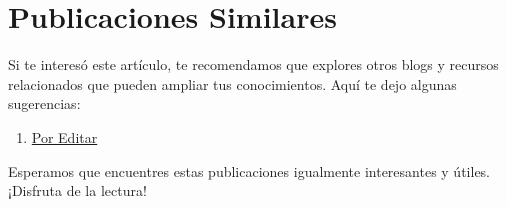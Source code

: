 \documentclass[
  doc,
  floatsintext,
  longtable,
  a4paper,
  nolmodern,
  notxfonts,
  notimes,
  colorlinks=true,linkcolor=blue,citecolor=blue,urlcolor=blue]{apa7}
\providecommand{\tightlist}{%
  \setlength{\itemsep}{0pt}\setlength{\parskip}{0pt}}
\begin{document}
\section{Publicaciones Similares}\label{publicaciones-similares}

Si te interesó este artículo, te recomendamos que explores otros blogs y
recursos relacionados que pueden ampliar tus conocimientos. Aquí te dejo
algunas sugerencias:

\begin{enumerate}
\def\labelenumi{\arabic{enumi}.}
\tightlist
\item
  \href{https://achalmaedison.netlify.app/matematicas/posts/2024-03-31-por-editar/index.pdf}{}
  \href{https://achalmaedison.netlify.app/matematicas/posts/2024-03-31-por-editar}{Por
  Editar}
\end{enumerate}

Esperamos que encuentres estas publicaciones igualmente interesantes y
útiles. ¡Disfruta de la lectura!
\end{document}
